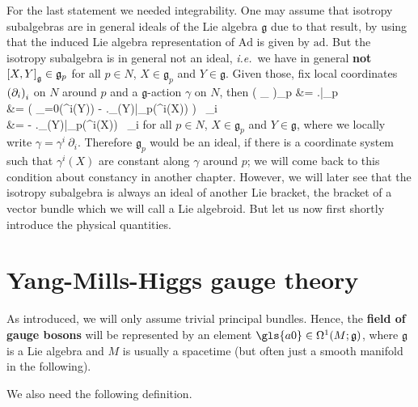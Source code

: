 For the last statement we needed integrability. One may assume that isotropy subalgebras are in general ideals of the Lie algebra $\mathfrak{g}$ due to that result, by using that the induced Lie algebra representation of $\mathrm{Ad}$ is given by $\mathrm{ad}$. But the isotropy subalgebra is in general not an ideal, \textit{i.e.}~we have in general \textbf{not} $\mleft[ X, Y \mright]_{\mathfrak{g}} \in \mathfrak{g}_p$ for all $p \in N$, $X \in \mathfrak{g}_p$ and $Y \in \mathfrak{g}$. Given those, fix local coordinates $\mleft(\partial_i\mright)_i$ on $N$ around $p$ and a $\mathfrak{g}$-action $\gamma$ on $N$, then 
\bas
\gamma\mleft( \mleft[ X, Y \mright]_{} \mright)_p
&=
\mleft.\mright|_p
\\
&=
\biggl(
	_{=0}\mleft(\gamma^i(Y)\mright) 
	- \mleft._{\gamma(Y)}\mright|_p\mleft(\gamma^i(X)\mright) 
\biggr) ~\partial_i
\\
&=
- \mleft._{\gamma(Y)}\mright|_p\mleft(\gamma^i(X)\mright) ~\partial_i
\eas
for all $p \in N$, $X \in \mathfrak{g}_p$ and $Y \in \mathfrak{g}$, where we locally write $\gamma = \gamma^i ~ \partial_i$.
Therefore $\mathfrak{g}_p$ would be an ideal, if there is a coordinate system such that $\gamma^i(X)$ are constant along $\gamma$ around $p$; we will come back to this condition about constancy in another chapter. However, we will later see that the isotropy subalgebra is always an ideal of another Lie bracket, the bracket of a vector bundle which we will call a Lie algebroid. But let us now first shortly introduce the physical quantities.

\section{Yang-Mills-Higgs gauge theory}\label{YMHGT}

As introduced, we will only assume trivial principal bundles. Hence, the \textbf{field of gauge bosons} will be represented by an element $\gls{a0} \in \Omega^1(M; \mathfrak{g})$, where $\mathfrak{g}$ is a Lie algebra and $M$ is usually a spacetime (but often just a smooth manifold in the following).

We also need the following definition.

